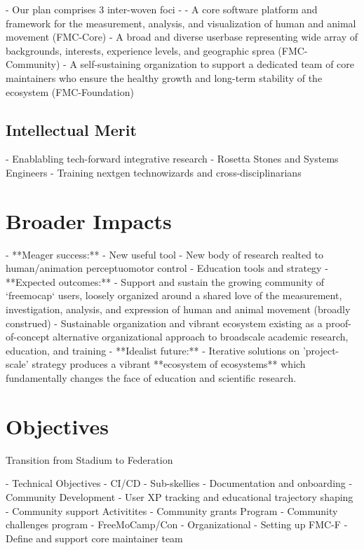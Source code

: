 \documentclass[11pt]{article}
\begin{document}

- Our plan comprises 3 inter-woven foci - 
- A core software platform and framework for the measurement, analysis, and visualization of human and animal movement (FMC-Core)
- A broad and diverse userbase representing wide array of backgrounds, interests, experience levels, and geographic sprea (FMC-Community)
- A self-sustaining organization to support a dedicated team of core maintainers who ensure the healthy growth and long-term stability of the ecosystem (FMC-Foundation)

\subsection{Intellectual Merit\label{sec:IM}}

- Enablabling tech-forward integrative research
- Rosetta Stones and Systems Engineers
- Training nextgen technowizards and cross-disciplinarians

\section{Broader Impacts\label{sec:BI}}
- **Meager success:**
  - New useful tool
  - New body of research realted to human/animation perceptuomotor control
  - Education tools and strategy
- **Expected outcomes:**
  - Support and sustain the growing community of `freemocap` users, loosely organized around a shared love of the measurement, investigation, analysis, and expression of human and animal movement (broadly construed) 
  - Sustainable organization and vibrant ecosystem existing as a proof-of-concept alternative organizational approach to broadscale academic research, education, and training
- **Idealist future:**
  - Iterative solutions on 'project-scale' strategy produces a vibrant **ecosystem of ecosystems** which fundamentally changes the face of education and scientific research.

\section{Objectives}

Transition from Stadium to Federation \cite{wor}


 - Technical Objectives
    - CI/CD
    - Sub-skellies
    - Documentation and onboarding
 - Community Development
    - User XP tracking and educational trajectory shaping
    - Community support Activitites
      - Community grants Program
      - Community challenges program 
      - FreeMoCamp/Con
 - Organizational 
    - Setting up FMC-F
    - Define and support core maintainer team
\end{document}
